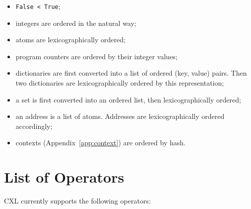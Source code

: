 \documentclass{report}
\begin{document}
\begin{itemize}
\item \texttt{False < True};
\item integers are ordered in the natural way;
\item atoms are lexicographically ordered;
\item program counters are ordered by their integer values;
\item dictionaries are first converted into a list of ordered (key, value)
pairs.  Then two dictionaries are lexicographically ordered by this
representation;
\item a set is first converted into an ordered list, then lexicographically
ordered;
\item an address is a list of atoms.  Addresses are lexicographically
ordered accordingly;
\item contexts (Appendix~\ref{app:context}) are ordered by hash.
\end{itemize}

\chapter{List of Operators}

CXL currently supports the following operators:
\end{document}
